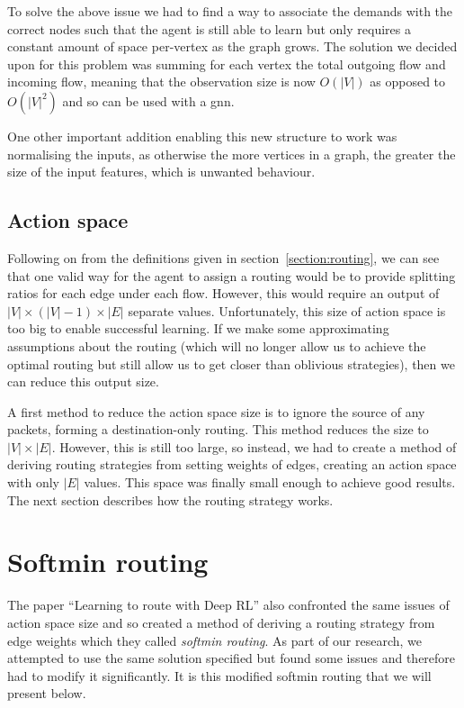 To solve the above issue we had to find a way to associate the demands with the correct nodes such that the agent is still able to learn but only requires a constant amount of space per-vertex as the graph grows. The solution we decided upon for this problem was summing for each vertex the total outgoing flow and incoming flow, meaning that the observation size is now $O(|V|)$ as opposed to $O(|V|^2)$ and so can be used with a \ac{gnn}.

One other important addition enabling this new structure to work was normalising the inputs, as otherwise the more vertices in a graph, the greater the size of the input features, which is unwanted behaviour.

\subsection{Action space}
Following on from the definitions given in section~\ref{section:routing}, we can see that one valid way for the agent to assign a routing would be to provide splitting ratios for each edge under each flow. However, this would require an output of $|V|\times(|V|-1)\times|E|$ separate values. Unfortunately, this size of action space is too big to enable successful learning. If we make some approximating assumptions about the routing (which will no longer allow us to achieve the optimal routing but still allow us to get closer than oblivious strategies), then we can reduce this output size.

A first method to reduce the action space size is to ignore the source of any packets, forming a destination-only routing. This method reduces the size to $|V|\times|E|$. However, this is still too large, so instead, we had to create a method of deriving routing strategies from setting weights of edges, creating an action space with only $|E|$ values. This space was finally small enough to achieve good results. The next section describes how the routing strategy works.

\section{Softmin routing}
The paper ``Learning to route with Deep RL''\cite{valadarsky2017learning} also confronted the same issues of action space size and so created a method of deriving a routing strategy from edge weights which they called \emph{softmin routing}. As part of our research, we attempted to use the same solution specified but found some issues and therefore had to modify it significantly. It is this modified softmin routing that we will present below.

